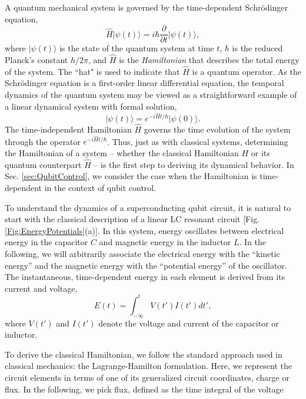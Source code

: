 \documentclass[aip,apr,twocolumn,showpacs,superscriptaddress,groupedaddress,nofootinbib,reprint]{revtex4-1}  %
\begin{document}
A quantum mechanical system is governed by the time-dependent Schr\"{o}dinger equation,
\begin{equation}
\hat{H} \vert \psi(t) \rangle = i \hbar \frac{\partial}{\partial t} \vert \psi(t) \rangle,
\end{equation}
%
\noindent where $\vert \psi(t) \rangle$ is the state of the quantum system at time $t$, $\hbar$ is the reduced Planck's constant $h/2\pi$, and $\hat{H}$ is the \textit{Hamiltonian} that describes the total energy of the system. The ``hat" is used to indicate that $\hat{H}$ is a quantum operator. As the Schr\"{o}dinger equation is a first-order linear differential equation, the temporal dynamics of the quantum system may be viewed as a straightforward example of a linear dynamical system with formal solution,
%
\begin{equation}
\vert \psi(t) \rangle = e^{-i \hat{H} t / \hbar} \vert \psi(0) \rangle.
\end{equation}
%
\noindent The time-independent Hamiltonian $\hat{H}$ governs the time evolution of the system through the operator $e^{-i \hat{H} t / \hbar}$. Thus, just as with classical systems, determining the Hamiltonian of a system -- whether the classical Hamiltonian $H$ or its quantum counterpart $\hat{H}$ -- is the first step to deriving its dynamical behavior. In Sec. \ref{sec:QubitControl}, we consider the case when the Hamiltonian is time-dependent in the context of qubit control.

To understand the dynamics of a superconducting qubit circuit, it is natural to start with the classical description of a linear LC resonant circuit [Fig. \ref{Fig:EnergyPotentials}(a)]. In this system, energy oscillates between electrical energy in the capacitor $C$ and magnetic energy in the inductor $L$. In the following, we will arbitrarily associate the electrical energy with the ``kinetic energy'' and the magnetic energy with the ``potential energy'' of the oscillator. The instantaneous, time-dependent energy in each element is derived from its current and voltage,
%
\begin{equation}
E(t) = \int_{-\infty}^{t} V(t')I(t')dt',
\label{Eq:ElementEnergy}
\end{equation}
%
\noindent where $V(t')$ and $I(t')$ denote the voltage and current of the capacitor or inductor.

To derive the classical Hamiltonian, we follow the standard approach used in classical mechanics: the Lagrange-Hamilton formulation. Here, we represent the circuit elements in terms of one of its generalized circuit coordinates, charge or flux. In the following, we pick flux, defined as the time integral of the voltage
\end{document}
